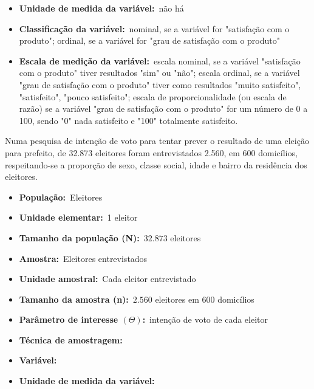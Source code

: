 \begin{enumerate}
\begin{itemize}
		\item \textbf{Unidade de medida da variável:}~não há
		
		\item \textbf{Classificação da variável:}~nominal, se a variável for "satisfação com o produto"; ordinal, se a variável
for "grau de satisfação com o produto"
		
		\item \textbf{Escala de medição da variável:}~escala nominal, se a variável "satisfação com o produto" tiver resultados
"sim" ou "não"; escala ordinal, se a variável "grau de satisfação com o produto" tiver como resultados
"muito satisfeito", "satisfeito", "pouco satisfeito"; escala de proporcionalidade (ou escala de razão) se a
variável "grau de satisfação com o produto" for um número de 0 a 100, sendo "0" nada satisfeito e "100"
totalmente satisfeito.
	\end{itemize}

	\subitem Numa pesquisa de intenção de voto para tentar prever o resultado de uma eleição para
prefeito, de 32.873 eleitores foram entrevistados 2.560, em 600 domicílios, respeitando-se a proporção de sexo, classe social, idade e bairro da residência dos eleitores.
	
	\begin{itemize}	
		\item \textbf{População:}~Eleitores
			
		\item \textbf{Unidade elementar:}~1 eleitor
		
		\item \textbf{Tamanho da população (N):}~$32.873$ eleitores
		
		\item \textbf{Amostra:}~Eleitores entrevistados
		
		\item \textbf{Unidade amostral:}~Cada eleitor entrevistado
		
		\item \textbf{Tamanho da amostra (n):}~$2.560$ eleitores em 600 domicílios
		
		\item \textbf{Parâmetro de interesse $\left(\varTheta\right)$:}~intenção de voto de cada eleitor
		
		\item \textbf{Técnica de amostragem:}~
		
		\item \textbf{Variável:}~
		
		\item \textbf{Unidade de medida da variável:}~
		

\end{itemize}
\end{enumerate}
